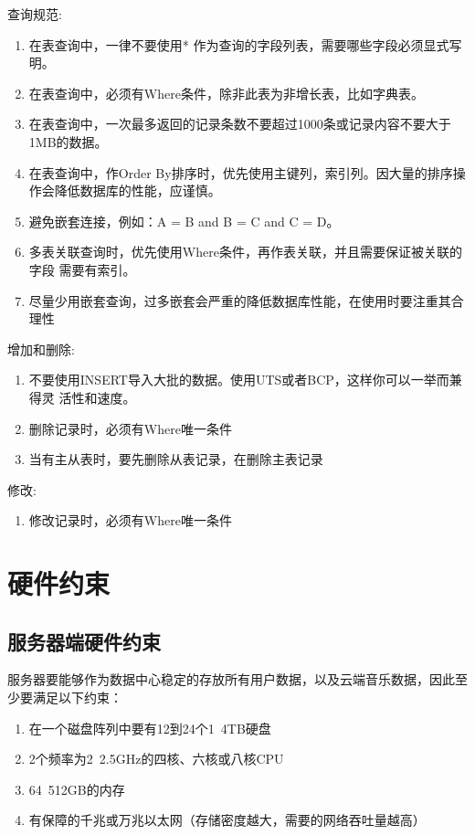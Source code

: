 查询规范:
\begin{enumerate}
	\item 在表查询中，一律不要使用* 作为查询的字段列表，需要哪些字段必须显式写明。
	\item 在表查询中，必须有Where条件，除非此表为非增长表，比如字典表。
	\item 在表查询中，一次最多返回的记录条数不要超过1000条或记录内容不要大于1MB的数据。
	\item 在表查询中，作Order By排序时，优先使用主键列，索引列。因大量的排序操作会降低数据库的性能，应谨慎。
	\item 避免嵌套连接，例如：A = B and B = C and C = D。   
	\item 多表关联查询时，优先使用Where条件，再作表关联，并且需要保证被关联的字段 需要有索引。
	\item 尽量少用嵌套查询，过多嵌套会严重的降低数据库性能，在使用时要注重其合理性
\end{enumerate}
增加和删除:
\begin{enumerate}
	\item 不要使用INSERT导入大批的数据。使用UTS或者BCP，这样你可以一举而兼得灵 活性和速度。
	\item 删除记录时，必须有Where唯一条件  
	\item 当有主从表时，要先删除从表记录，在删除主表记录
\end{enumerate} 

修改:
\begin{enumerate}
	\item 修改记录时，必须有Where唯一条件
\end{enumerate}

\section{硬件约束}

\subsection{服务器端硬件约束}
服务器要能够作为数据中心稳定的存放所有用户数据，以及云端音乐数据，因此至少要满足以下约束：
\begin{enumerate}
	\item 在一个磁盘阵列中要有12到24个1~4TB硬盘
	\item 2个频率为2~2.5GHz的四核、六核或八核CPU
	\item 64~512GB的内存
	\item 有保障的千兆或万兆以太网（存储密度越大，需要的网络吞吐量越高）
\end{enumerate}
